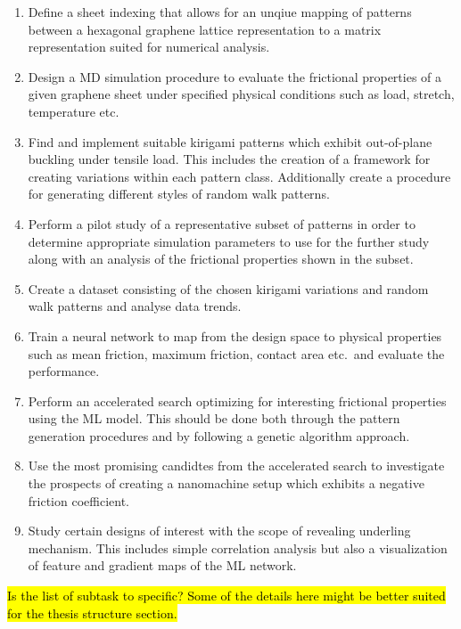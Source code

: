 \begin{enumerate} %
    \item Define a sheet indexing that allows for an unqiue mapping of patterns between a hexagonal graphene lattice representation to a matrix representation suited for numerical analysis. 
    \item  Design a \acrshort{MD} simulation procedure to evaluate the frictional properties of a given graphene sheet under specified physical conditions such as load, stretch, temperature etc. 
    \item Find and implement suitable kirigami patterns which exhibit out-of-plane buckling under tensile load. This includes the creation of a framework for creating variations within each pattern class. Additionally create a procedure for generating different styles of random walk patterns.
    \item Perform a pilot study of a representative subset of patterns in order to determine appropriate simulation parameters to use for the further study along with an analysis of the frictional properties shown in the subset.
    \item Create a dataset consisting of the chosen kirigami variations and random walk patterns and analyse data trends.
    \item Train a neural network to map from the design space to physical properties such as mean friction, maximum friction, contact area etc.\ and evaluate the performance.
    \item Perform an accelerated search optimizing for interesting frictional properties using the \acrshort{ML} model. This should be done both through the pattern generation procedures and by following a genetic algorithm approach. 
    \item Use the most promising candidtes from the accelerated search to investigate the prospects of creating a nanomachine setup which exhibits a negative friction coefficient. 
    \item Study certain designs of interest with the scope of revealing underling mechanism. This includes simple correlation analysis but also a visualization of feature and gradient maps of the \acrshort{ML} network.
\end{enumerate}

\hl{Is the list of subtask to specific? Some of the details here might be better suited for the thesis structure section.}

